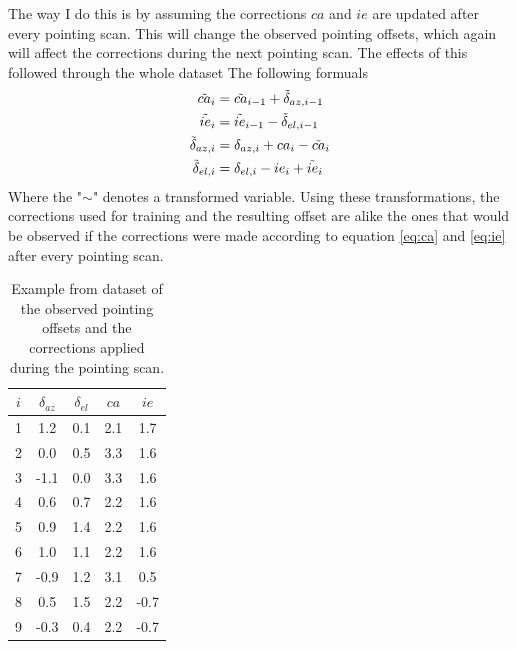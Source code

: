 The way I do this is by assuming the corrections $ca$ and $ie$ are updated after every pointing scan.
This will change the observed pointing offsets, which again will affect the corrections during the next pointing scan.
The effects of this followed through the whole dataset
The following formuals 
\begin{align}
    \Tilde{ca}_i &= \Tilde{ca}_{i-1} + \Tilde{\delta}_{az,i-1}\label{eq:ca_tilde}\\
    \Tilde{ie}_i &= \Tilde{ie}_{i-1} - \Tilde{\delta}_{el,i-1\label{eq:ie_tilde}}\\
    \Tilde{\delta}_{az,i} &= \delta_{az,i} + ca_i - \Tilde{ca}_i\label{eq:off_az_tilde}\\
    \Tilde{\delta}_{el,i} &= \delta_{el,i} - ie_i + \Tilde{ie}_i\label{eq:off_el_tilde}
\end{align}
Where the "$\sim$" denotes a transformed variable.
Using these transformations,
the corrections used for training and the resulting offset are alike the ones that would be observed if the corrections were made according to equation
\eqref{eq:ca} and \eqref{eq:ie} after every pointing scan.


\begin{table}[H]
    \centering
    \caption{Example from dataset of the observed pointing offsets and the corrections applied during the pointing scan.}
    \label{tab:offset_and_correction}
    \begin{tabular}{ccccc}
    \toprule
    $i$ &  $\delta_{az}$ &  $\delta_{el}$ &  $ca$ & $ie$  \\
    \midrule
    1 & 1.2 & 0.1 & 2.1 &  1.7 \\
    2 &     0.0 & 0.5 & 3.3 &  1.6 \\
    3 &    -1.1 & 0.0 & 3.3 &  1.6 \\
    4 &     0.6 & 0.7 & 2.2 &  1.6 \\
    5 &     0.9 & 1.4 & 2.2 &  1.6 \\
    6 &     1.0 & 1.1 & 2.2 &  1.6 \\
    7 &    -0.9 & 1.2 & 3.1 &  0.5 \\
    8 &     0.5 & 1.5 & 2.2 & -0.7 \\
    9 &    -0.3 & 0.4 & 2.2 & -0.7 \\
    \bottomrule
    \end{tabular}
\end{table}


